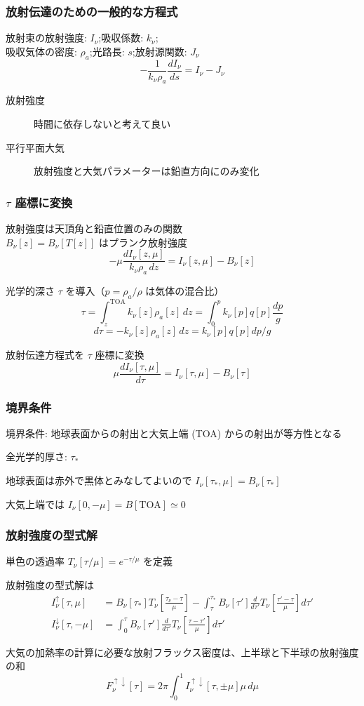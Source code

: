 \documentclass[unicode,colorlinks]{beamer}
\begin{document}
\begin{frame}
	\frametitle{放射伝達のための一般的な方程式}
	放射束の放射強度: $I_\nu$;\quad 吸収係数: $k_\nu$;\\
	吸収気体の密度: $\rho_a$;\quad 光路長: $s$;\quad 放射源関数: $J_\nu$
	\[-\frac{1}{k_\nu \rho_a}\frac{dI_\nu}{ds}=I_\nu-J_\nu\]

	\begin{description}
		\item[放射強度] 時間に依存しないと考えて良い
		\item[平行平面大気] 放射強度と大気パラメーターは鉛直方向にのみ変化
	\end{description}
\end{frame}

\begin{frame}
	\frametitle{$\tau$ 座標に変換}
	放射強度は天頂角と鉛直位置のみの関数\\
	$B_\nu[z]=B_\nu[T[z]]$ はプランク放射強度
	\[-\mu\frac{dI_\nu[z,\mu]}{k_\nu\rho_a\,dz}=I_\nu[z,\mu]-B_\nu[z]\]

	光学的深さ $\tau$ を導入（$p=\rho_a/\rho$ は気体の混合比）
	\[\tau=\int^{\mathrm{TOA}}_{z} k_\nu[z]\rho_a[z]\,dz=\int^p_0 k_\nu[p]q[p]\frac{dp}{g}\]
	\[d\tau=-k_\nu[z]\rho_a[z]\,dz=k_\nu[p]q[p]dp/g\]

	放射伝達方程式を $\tau$ 座標に変換
	\[\mu\frac{dI_\nu[\tau,\mu]}{d\tau}=I_\nu[\tau,\mu]-B_\nu[\tau]\]
\end{frame}

\begin{frame}
	\frametitle{境界条件}
	境界条件: 地球表面からの射出と大気上端 (TOA) からの射出が等方性となる

	全光学的厚さ: $\tau_*$

	地球表面は赤外で黒体とみなしてよいので $I_\nu[\tau_*,\mu]=B_\nu[\tau_*]$

	大気上端では $I_\nu[0,-\mu]=B[\mathrm{TOA}]\simeq0$
\end{frame}

\begin{frame}
	\frametitle{放射強度の型式解}
	単色の透過率 $T_\nu[\tau/\mu]=e^{-\tau/\mu}$ を定義

	放射強度の型式解は
	\begin{align*}
		I^\uparrow_\nu[\tau,\mu]
			&=B_\nu[\tau_*]T_\nu\left[\frac{\tau_\nu-\tau}{\mu}\right]
			-\int^{\tau_*}_\tau B_\nu[\tau']\frac{d}{d\tau'}T_\nu\left[\frac{\tau'-\tau}{\mu}\right]d\tau'\\
		I^\downarrow_\nu[\tau,-\mu]
			&=\int^\tau_0 B_\nu[\tau']\frac{d}{d\tau'}T_\nu\left[\frac{\tau-\tau'}{\mu}\right]d\tau'
	\end{align*}

	大気の加熱率の計算に必要な放射フラックス密度は、上半球と下半球の放射強度の和
	\[F^{\uparrow\downarrow}_\nu[\tau]=2\pi\int^1_0 I^{\uparrow\downarrow}_\nu[\tau,\pm\mu]\mu\,d\mu\]
\end{frame}
\end{document}
